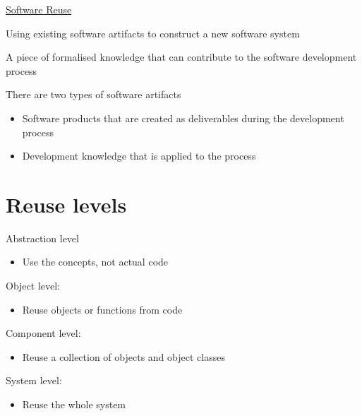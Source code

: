 \documentclass{article}[18pt]
\begin{document}
\begin{center}
\underline{\huge Software Reuse}
\end{center}
\begin{definition}
Using existing software artifacts to construct a new software system
\end{definition}
\begin{definition}[Artifact]
A piece of formalised knowledge that can contribute to the software development process
\end{definition}
There are two types of software artifacts
\begin{itemize}
	\item Software products that are created as deliverables during the development process
	\item Development knowledge that is applied to the process
\end{itemize}
\section{Reuse levels}
Abstraction level
\begin{itemize}
	\item Use the concepts, not actual code
\end{itemize}
Object level:
\begin{itemize}
	\item Reuse objects or functions from code
\end{itemize}
Component level:
\begin{itemize}
	\item Reuse a collection of objects and object classes
\end{itemize}
System level:
\begin{itemize}
	\item Reuse the whole system
\end{itemize}
\end{document}

